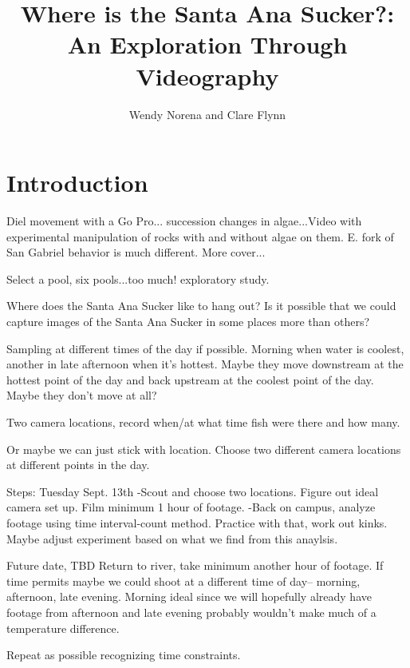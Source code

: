 \documentclass{tufte-handout}
\title{Where is the Santa Ana Sucker?: An Exploration Through Videography}
\author{Wendy Norena and Clare Flynn}
\begin{document}


\maketitle

\section{Introduction}


  Diel movement with a Go Pro... succession changes in algae...Video with experimental manipulation of rocks with and without algae on them. E. fork of San Gabriel behavior is much different. More cover...
  
  Select a pool, six pools...too much!  exploratory study.
  
  
Where does the Santa Ana Sucker like to hang out? Is it possible that we could capture images of the Santa Ana Sucker in some places more than others?


Sampling at different times of the day if possible. Morning when water is coolest, another in late afternoon when it's hottest. Maybe they move downstream at the hottest point of the day and back upstream at the coolest point of the day. Maybe they don't move at all?

Two camera locations, record when/at what time fish were there and how many. 


Or maybe we can just stick with location. Choose two different camera locations at different points in the day. 


Steps:
Tuesday Sept. 13th
-Scout and choose two locations. Figure out ideal camera set up. Film minimum 1 hour of footage.
-Back on campus, analyze footage using time interval-count method. Practice with that, work out kinks. Maybe adjust experiment based on what we find from this anaylsis.

Future date, TBD
Return to river, take minimum another hour of footage. If time permits maybe we could shoot at a different time of day-- morning, afternoon, late evening. Morning ideal since we will hopefully already have footage from afternoon and late evening probably wouldn't make much of a temperature difference. 

Repeat as possible recognizing time constraints.
\end{document}
